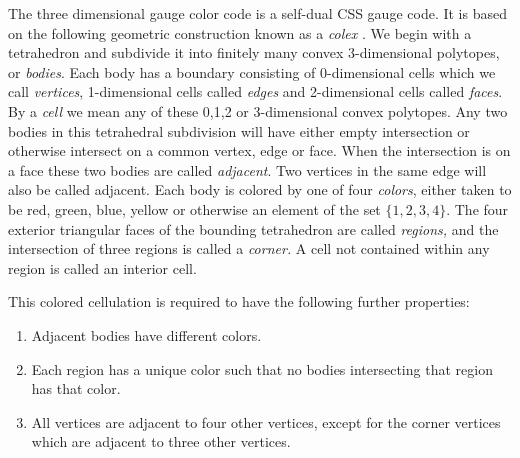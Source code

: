 \documentclass[a4paper,onecolumn,11pt,unpublished]{quantumarticle}
\begin{document}
The three dimensional gauge color code \cite{Bombin2015,Bombin2015single,Kubica2015}
is a self-dual CSS gauge code. 
It is based on the following geometric construction known
as a \emph{colex} \cite{Bombin2007exact}.
We begin with a tetrahedron and subdivide it into finitely many
convex 3-dimensional polytopes, or \emph{bodies}.
Each body has a boundary consisting of 0-dimensional cells
which we call \emph{vertices}, 1-dimensional cells called \emph{edges}
and 2-dimensional cells called \emph{faces}.
By a \emph{cell} we mean any of these 0,1,2 or 3-dimensional convex polytopes.
Any two bodies in this tetrahedral subdivision will
have either empty intersection or otherwise intersect
on a common vertex, edge or face.
When the intersection is on a face these two bodies
are called \emph{adjacent}.
Two vertices in the same edge will also be called adjacent.
Each body is colored by one of four \emph{colors},
either taken to be red, green, blue, yellow or 
otherwise an element of the set $\{1, 2, 3, 4\}.$
The four exterior triangular faces of the bounding tetrahedron are
called \emph{regions,}
and the intersection of three regions is called
a \emph{corner.}
A cell not contained within any region is called an interior cell.

This colored cellulation is required to have the following further properties:
\begin{enumerate}
\item Adjacent bodies have different colors.
\item Each region has a unique color 
such that no bodies intersecting that region has that color.
\item All vertices are adjacent to four other vertices,
except for the corner vertices which are adjacent to three other vertices.
\end{enumerate}
\end{document}
